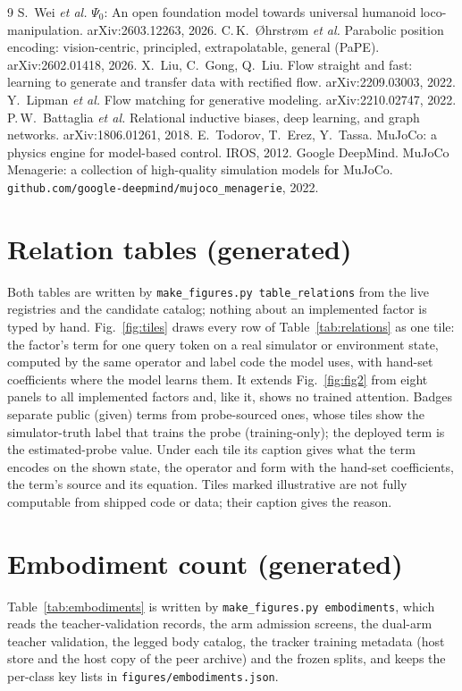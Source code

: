 \documentclass[10pt,twocolumn]{article}
\newcommand{\code}[1]{\texttt{\small #1}}
\begin{document}
\begingroup\small\setlength{\parskip}{0pt}\setlength{\itemsep}{0pt}
\begin{thebibliography}{9}\setlength{\itemsep}{0pt}\setlength{\parsep}{0pt}
 S.~Wei \emph{et al.} $\Psi_0$: An open foundation model towards universal humanoid loco-manipulation. arXiv:2603.12263, 2026.
 C.\,K.~{\O}hrstr{\o}m \emph{et al.} Parabolic position encoding: vision-centric, principled, extrapolatable, general (PaPE). arXiv:2602.01418, 2026.
 X.~Liu, C.~Gong, Q.~Liu. Flow straight and fast: learning to generate and transfer data with rectified flow. arXiv:2209.03003, 2022.
 Y.~Lipman \emph{et al.} Flow matching for generative modeling. arXiv:2210.02747, 2022.
 P.\,W.~Battaglia \emph{et al.} Relational inductive biases, deep learning, and graph networks. arXiv:1806.01261, 2018.
 E.~Todorov, T.~Erez, Y.~Tassa. MuJoCo: a physics engine for model-based control. IROS, 2012.
 Google DeepMind. MuJoCo Menagerie: a collection of high-quality simulation models for MuJoCo. \texttt{github.com/google-deepmind/mujoco\_menagerie}, 2022.
\end{thebibliography}\endgroup

\appendix
\section{Relation tables (generated)}\label{app:relations}
Both tables are written by \code{make\_figures.py table\_relations} from the live registries and the candidate catalog; nothing about an implemented factor is typed by hand.
\relfull
Fig.~\ref{fig:tiles} draws every row of Table~\ref{tab:relations} as one tile: the factor's term for one query token on a real simulator or environment state, computed by the same operator and label code the model uses, with hand-set coefficients where the model learns them. It extends Fig.~\ref{fig:fig2} from eight panels to all implemented factors and, like it, shows no trained attention. Badges separate public (given) terms from probe-sourced ones, whose tiles show the simulator-truth label that trains the probe (training-only); the deployed term is the estimated-probe value. Under each tile its caption gives what the term encodes on the shown state, the operator and form with the hand-set coefficients, the term's source and its equation. Tiles marked illustrative are not fully computable from shipped code or data; their caption gives the reason.
\tilegrid
\relplanned

\section{Embodiment count (generated)}\label{app:embodiments}
Table~\ref{tab:embodiments} is written by \code{make\_figures.py embodiments}, which reads the teacher-validation records, the arm admission screens, the dual-arm teacher validation, the legged body catalog, the tracker training metadata (host store and the host copy of the peer archive) and the frozen splits, and keeps the per-class key lists in \code{figures/embodiments.json}.
\embtable
\end{document}
